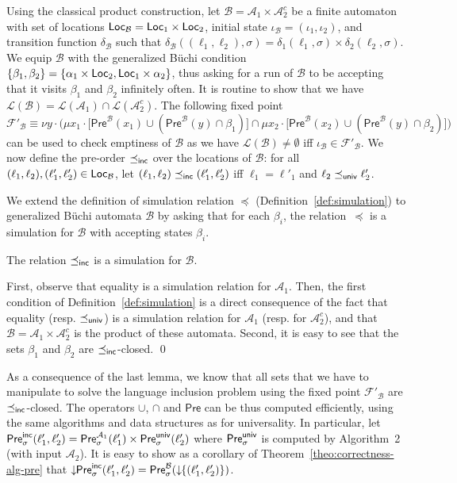 \documentclass{LMCS}
\newcommand{\Pre}{\mathsf{Pre}}
\newcommand{\closure}[1]{\downarrow \!\!#1}
\renewcommand{\l}{{\ell}}
\newcommand{\Loc}{{\sf Loc}}
\newcommand{\A}{\mathcal{A}}
\newcommand{\B}{\mathcal{B}}
\newcommand{\F}{\mathcal{F}}
\renewcommand{\L}{\mathcal{L}}
\begin{document}
Using the classical product construction, let $\B = \A_1 \times \A_2^c$ be a finite automaton
with set of locations $\Loc_{\B} = \Loc_1 \times \Loc_2$, initial state 
$\iota_{\B} = (\iota_1, \iota_2)$, and transition function $\delta_{\B}$ such that 
$\delta_{\B}((\l_1, \l_2), \sigma) = \delta_1(\l_1,\sigma) \times \delta_2(\l_2,\sigma)$.
We equip $\B$ with the generalized B\"uchi condition 
$\{\beta_1,\beta_2\} = \{\alpha_1 \times \Loc_2, \Loc_1 \times \alpha_2\}$, thus asking 
for a run of $\B$ to be accepting that it visits $\beta_1$ and $\beta_2$
infinitely often. It is routine to show that we have $\L(\B) = \L(\A_1) \cap \L(\A_2^c)$. 
The following fixed point
$$\F'_{\B} \equiv \nu y \cdot \Big( 
		\mu x_1 \cdot \big[ \Pre^{\B}(x_1) \cup ( \Pre^{\B}(y) \cap \beta_1 ) \big] \cap
		\mu x_2 \cdot \big[ \Pre^{\B}(x_2) \cup ( \Pre^{\B}(y) \cap \beta_2 ) \big]
	\Big)
$$
\noindent
can be used to check emptiness of $\B$ as we have $\L(\B) \neq \emptyset$ 
iff $\iota_{\B} \in \F'_{\B}$.  
We now define the pre-order $\preceq_{{\sf inc}}$ over the locations of $\B$: 
for all $(\l_1,\l_2),(\l_1',\l_2') \in \Loc_{\B}$, 
let $(\l_1,\l_2) \preceq_{{\sf inc}} (\l_1',\l_2')$ iff $\l_1 = \l'_1$ and 
$\l_2 \preceq_{{\sf univ}} \l_2'$. 


We extend the definition of simulation relation $\preceq$ (Definition~\ref{def:simulation})
to generalized B\"uchi automata $\B$ by asking that for each $\beta_i$, 
the relation~$\preceq$ is a simulation for $\B$ with accepting states $\beta_i$.

\begin{lem}
The relation $\preceq_{{\sf inc}}$ is a simulation for $\B$.
\end{lem} 

\proof 
First, observe that equality is a simulation relation for $\A_1$. Then, the
first condition of Definition~\ref{def:simulation} is a direct consequence
of the fact that equality (resp. $\preceq_{{\sf univ}}$) is a simulation 
relation for $\A_1$ (resp. for $\A_2^c$), and that $\B = \A_1 \times \A_2^c$ 
is the product of these automata.
Second, it is easy to see that the sets $\beta_1$ and $\beta_2$ are 
$\preceq_{{\sf inc}}$-closed.
\qed

As a consequence of the last lemma, we know that all sets that we
have to manipulate to solve the language inclusion problem using the
fixed point $\F'_{\B}$ are $\preceq_{{\sf inc}}$-closed. The operators
$\cup$, $\cap$ and $\Pre$ can be thus computed efficiently, using the same 
algorithms and data structures as for universality. In particular, let 
$\Pre^{{\sf inc}}_\sigma(\l_1',\l_2') = \Pre^{\A_1}_\sigma(\l_1')
 \times
 \Pre^{{\sf univ}}_\sigma(\l_2')
$
where
$\Pre^{{\sf univ}}_{\sigma}$ is computed by Algorithm~2 (with input $\A_2$).
It is easy to show as a corollary of Theorem~\ref{theo:correctness-alg-pre} that 
$\closure{\Pre^{{\sf inc}}_\sigma(\l_1',\l_2')} = \Pre^{\B}_{\sigma}(\closure{\{(\l_1',\l_2')\}})$.
\end{document}
